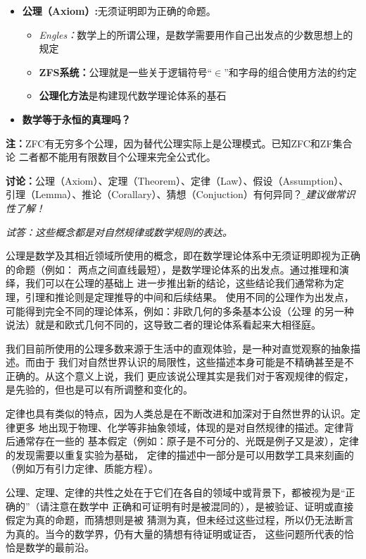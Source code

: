 \begin{shaded}
\begin{itemize}
	\item {\bf 公理（Axiom）:}无须证明即为正确的命题。
	\begin{itemize}
	  \item {\it Engles：}数学上的所谓公理，是数学需要用作自己出发点的少数思想上的规定 
	  \item {\bf ZFS系统：}公理就是一些关于逻辑符号{“$\in$”}和{字母}的组合使用方法的约定
	  \item {\bf 公理化方法}是构建现代数学理论体系的基石
	\end{itemize}
	\item {\bf {数学等于永恒的真理吗？}}
	\end{itemize}
	
	{\bf 注：}ZFC有无穷多个公理，因为替代公理实际上是公理模式。已知ZFC和ZF集合论
	二者都不能用有限数目个公理来完全公式化。
	
	{\bf 讨论：}公理（Axiom）、定理（Theorem）、定律（Law）、假设（Assumption）、
	引理（Lemma）、推论（Corallary）、猜想（Conjuction）有何异同？
	{\b\dotfill\it 建议做常识性了解！}
	
	{\it 试答：这些概念都是对自然规律或数学规则的表达。
	
	公理是数学及其相近领域所使用的概念，即在数学理论体系中无须证明即视为正确的命题（例如：
	两点之间直线最短），是数学理论体系的出发点。通过推理和演绎，我们可以在公理的基础上
	进一步推出新的结论，这些结论我们通常称为定理，引理和推论则是定理推导的中间和后续结果。
	使用不同的公理作为出发点，可能得到完全不同的理论体系，例如：非欧几何的多条基本公设（公理
	的另一种说法）就是和欧式几何不同的，这导致二者的理论体系看起来大相径庭。
	
	我们目前所使用的公理多数来源于生活中的直观体验，是一种对直觉观察的抽象描述。而由于
	我们对自然世界认识的局限性，这些描述本身可能是不精确甚至是不正确的。从这个意义上说，我们
	更应该说公理其实是我们对于客观规律的假定，是先验的，但也是可以有所调整和变化的。
	
	定律也具有类似的特点，因为人类总是在不断改进和加深对于自然世界的认识。定律更多
	地出现于物理、化学等非抽象领域，体现的是对自然规律的描述。定律背后通常存在一些的
	基本假定（例如：原子是不可分的、光既是例子又是波），定律的发现需要以重复实验为基础，
	定律的描述中一部分是可以用数学工具来刻画的（例如万有引力定律、质能方程）。
	
	公理、定理、定律的共性之处在于它们在各自的领域中或背景下，都被视为是“正确的”（请注意在数学中
	正确和可证明有时是被混同的），是被验证、证明或直接假定为真的命题，而猜想则是被
	猜测为真，但未经过这些过程，所以仍无法断言为真的。当今的数学界，仍有大量的猜想有待证明或证否，
	这些问题所代表的恰恰是数学的最前沿。
	}
\end{shaded}
	
